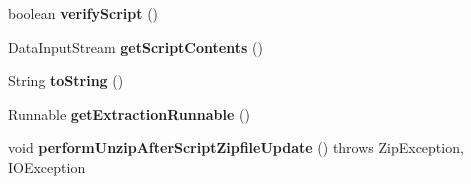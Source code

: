 \begin{DoxyCompactItemize}
\item 
\hypertarget{classCASUAL_1_1caspac_1_1Script_a650e8a68460d2e087028c6b7222ff61d}{boolean {\bfseries verify\-Script} ()}\label{classCASUAL_1_1caspac_1_1Script_a650e8a68460d2e087028c6b7222ff61d}

\item 
\hypertarget{classCASUAL_1_1caspac_1_1Script_a17a45608b9e9de9ab8f083781e0ef9b4}{Data\-Input\-Stream {\bfseries get\-Script\-Contents} ()}\label{classCASUAL_1_1caspac_1_1Script_a17a45608b9e9de9ab8f083781e0ef9b4}

\item 
\hypertarget{classCASUAL_1_1caspac_1_1Script_aa4417a95f79b967e72da3e7e9bd6458e}{String {\bfseries to\-String} ()}\label{classCASUAL_1_1caspac_1_1Script_aa4417a95f79b967e72da3e7e9bd6458e}

\item 
\hypertarget{classCASUAL_1_1caspac_1_1Script_a545611076ea6c3b3e8e0b2ab22e66e4f}{Runnable {\bfseries get\-Extraction\-Runnable} ()}\label{classCASUAL_1_1caspac_1_1Script_a545611076ea6c3b3e8e0b2ab22e66e4f}

\item 
\hypertarget{classCASUAL_1_1caspac_1_1Script_a335fa094032e79c5be3daa0e7cdf511c}{void {\bfseries perform\-Unzip\-After\-Script\-Zipfile\-Update} ()  throws Zip\-Exception, I\-O\-Exception }\label{classCASUAL_1_1caspac_1_1Script_a335fa094032e79c5be3daa0e7cdf511c}

\end{DoxyCompactItemize}
